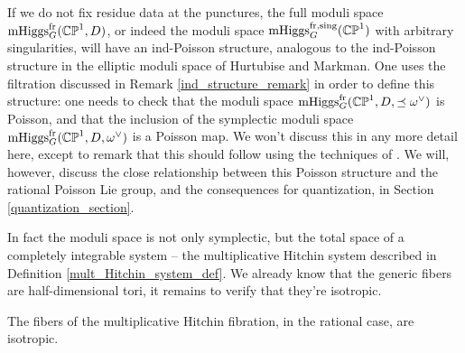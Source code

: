 \documentclass[10pt, oneside]{article}
\DeclareMathOperator{\mhiggs}{mHiggs}
\newcommand{\fr}{\mathrm{fr}}
\begin{document}
\begin{remark}
If we do not fix residue data at the punctures, the full moduli space $\mhiggs_G^\fr(\bb{CP}^1,D)$, or indeed the moduli space $\mhiggs_G^{\text{fr,sing}}(\bb{CP}^1)$ with arbitrary singularities, will have an ind-Poisson structure, analogous to the ind-Poisson structure in the elliptic moduli space of Hurtubise and Markman.  One uses the filtration discussed in Remark \ref{ind_structure_remark} in order to define this structure: one needs to check that the moduli space  $\mhiggs_G^\fr(\bb{CP}^1,D, \preceq \omega^\vee)$ is Poisson, and that the inclusion of the symplectic moduli space $\mhiggs_G^\fr(\bb{CP}^1,D, \omega^\vee)$ is a Poisson map.  We won't discuss this in any more detail here, except to remark that this should follow using the techniques of \cite[Section 7]{HurtubiseMarkman}.  We will, however, discuss the close relationship between this Poisson structure and the rational Poisson Lie group, and the consequences for quantization, in Section \ref{quantization_section}.
\end{remark}

In fact the moduli space is not only symplectic, but the total space of a completely integrable system -- the multiplicative Hitchin system described in Definition \ref{mult_Hitchin_system_def}.  We already know that the generic fibers are half-dimensional tori, it remains to verify that they're isotropic.

\begin{prop}
The fibers of the multiplicative Hitchin fibration, in the rational case, are isotropic.
\end{prop}
\end{document}
